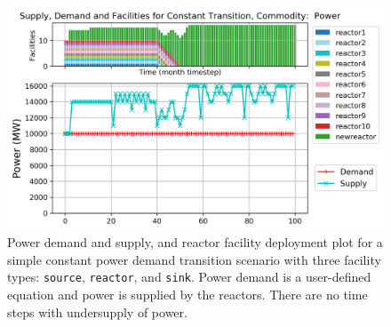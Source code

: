     \begin{figure}[]
        \centering
        \includegraphics[width=0.8\linewidth]{figures/constanttransition-power.png} 
            \caption{Power demand and supply, and reactor facility deployment plot for  
            a simple constant power demand transition scenario with 
            three facility types: \texttt{source}, \texttt{reactor}, and \texttt{sink}.
            Power demand is a user-defined equation and power is supplied by the reactors.
            There are no time steps with undersupply of power.}
            \label{fig:constanttransition-power}
    \end{figure}

